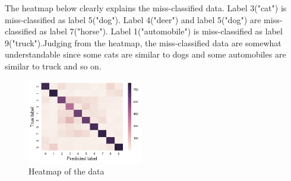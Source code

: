 The heatmap below clearly explains the miss-classified data. Label 3("cat") is miss-classified as label 5("dog"). Label 4("deer") and label 5("dog") are miss-classified as label 7("horse"). Label 1("automobile") is miss-classified as label 9("truck").Judging from the heatmap, the miss-classified data are somewhat understandable since some cats are similar to dogs and some automobiles are similar to truck and so on.




\begin{figure}[H]

	\begin{center}
	\includegraphics[width=5cm]{picture/heatmap.png}
	\caption{Heatmap of the data}
	\end{center}
	\label{fig:17}

\end{figure}